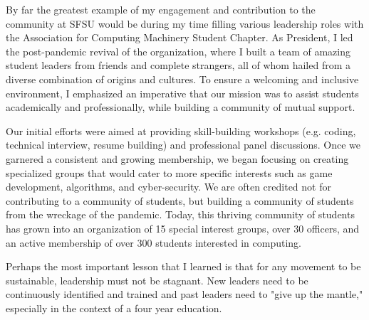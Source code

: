\documentclass[12pt]{article}
\begin{document}
By far the greatest example of my engagement and contribution to the community at SFSU would be during my time filling various leadership
roles with the Association for Computing Machinery Student Chapter.  As President, I led the post-pandemic revival of the organization,
where I built a team of amazing student leaders from friends and complete strangers, all of whom hailed from a diverse combination of
origins and cultures.  To ensure a welcoming and inclusive environment, I emphasized an imperative that our mission was to assist students
academically and professionally, while building a community of mutual support.

Our initial efforts were aimed at providing skill-building workshops (e.g. coding, technical interview, resume building) and professional
panel discussions.  Once we garnered a consistent and growing membership, we began focusing on creating specialized groups that would cater
to more specific interests such as game development, algorithms, and cyber-security.  We are often credited not for contributing to a
community of students, but building a community of students from the wreckage of the pandemic.  Today, this thriving community of students
has grown into an organization of 15 special interest groups, over 30 officers, and an active membership of over 300 students interested in
computing.

Perhaps the most important lesson that I learned is that for any movement to be sustainable, leadership must not be stagnant.  New leaders
need to be continuously identified and trained and past leaders need to "give up the mantle," especially in the context of a four year
education.





\end{document}
